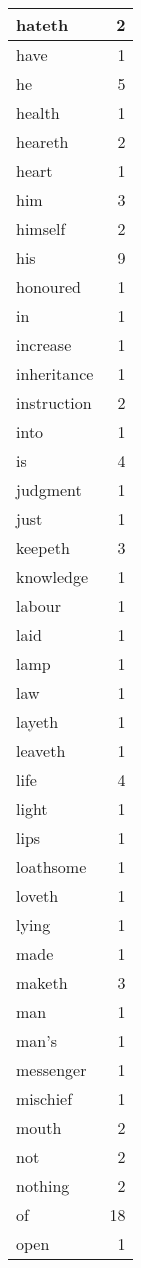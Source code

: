 \begin{center}
\begin{longtable}{l|r}
hateth & 2\\ \hline 
have & 1\\ \hline 
he & 5\\ \hline 
health & 1\\ \hline 
heareth & 2\\ \hline 
heart & 1\\ \hline 
him & 3\\ \hline 
himself & 2\\ \hline 
his & 9\\ \hline 
honoured & 1\\ \hline 
in & 1\\ \hline 
increase & 1\\ \hline 
inheritance & 1\\ \hline 
instruction & 2\\ \hline 
into & 1\\ \hline 
is & 4\\ \hline 
judgment & 1\\ \hline 
just & 1\\ \hline 
keepeth & 3\\ \hline 
knowledge & 1\\ \hline 
labour & 1\\ \hline 
laid & 1\\ \hline 
lamp & 1\\ \hline 
law & 1\\ \hline 
layeth & 1\\ \hline 
leaveth & 1\\ \hline 
life & 4\\ \hline 
light & 1\\ \hline 
lips & 1\\ \hline 
loathsome & 1\\ \hline 
loveth & 1\\ \hline 
lying & 1\\ \hline 
made & 1\\ \hline 
maketh & 3\\ \hline 
man & 1\\ \hline 
man's & 1\\ \hline 
messenger & 1\\ \hline 
mischief & 1\\ \hline 
mouth & 2\\ \hline 
not & 2\\ \hline 
nothing & 2\\ \hline 
of & 18\\ \hline 
open & 1\\ \hline 

\end{longtable}
\end{center}
